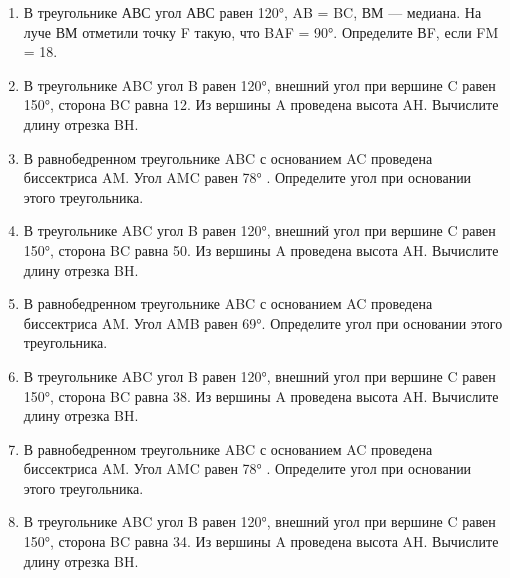 \documentclass[a4paper,12pt]{article}
\newcommand{\taskspace}{\par\vspace{0.42cm}}
\begin{document}
\begin{enumerate}[resume]
\taskspace

\item В треугольнике АВС угол АВС равен 120°, AB = BC, ВМ --- медиана. На луче ВМ отметили точку F такую, что BAF = 90°. Определите ВF, если FM = 18.

\taskspace

\item В треугольнике ABC угол B равен 120°, внешний угол при вершине C равен 150°, сторона BC равна 12. Из вершины A проведена высота AH. Вычислите длину отрезка BH.

\taskspace

\item В равнобедренном треугольнике ABC с основанием AC проведена биссектриса AM. Угол AMC равен 78° . Определите угол при основании этого треугольника.

\taskspace

\item В треугольнике ABC угол B равен 120°, внешний угол при вершине C равен 150°, сторона BC равна 50. Из вершины A проведена высота AH. Вычислите длину отрезка BH.

\taskspace

\item В равнобедренном треугольнике ABC с основанием AC проведена биссектриса AM. Угол AMB равен 69°. Определите угол при основании этого треугольника.

\taskspace

\item В треугольнике ABC угол B равен 120°, внешний угол при вершине C равен 150°, сторона BC равна 38. Из вершины A проведена высота AH. Вычислите длину отрезка BH.

\taskspace

\item В равнобедренном треугольнике ABC с основанием AC проведена биссектриса AM. Угол AMC равен 78° . Определите угол при основании этого треугольника.

\taskspace

\item В треугольнике ABC угол B равен 120°, внешний угол при вершине C равен 150°, сторона BC равна 34. Из вершины A проведена высота AH. Вычислите длину отрезка BH.

\taskspace


\end{enumerate}
\end{document}
